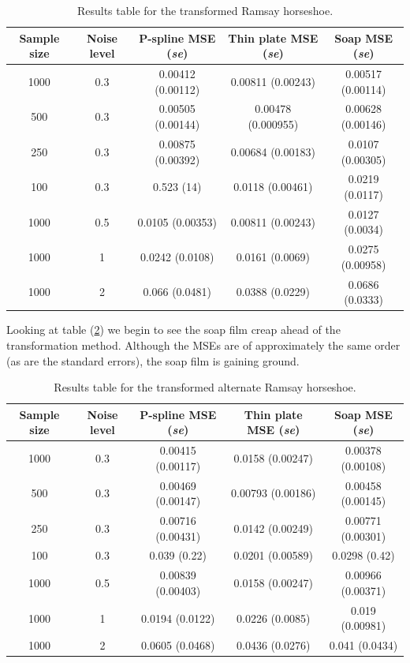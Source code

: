 \documentclass[a4paper,10pt]{amsart}
\begin{document}
\begin{table}[ht]
\begin{tabular}{c c c c c}\\
Sample size & Noise level & P-spline MSE (\emph{se}) & Thin plate MSE (\emph{se}) & Soap MSE (\emph{se}) \\
\hline
\hline
1000 & 0.3 & 0.00412 (0.00112) & 0.00811 (0.00243) & 0.00517 (0.00114) \\ 
500 & 0.3 & 0.00505 (0.00144) & 0.00478 (0.000955) & 0.00628 (0.00146) \\ 
250 & 0.3 & 0.00875 (0.00392) & 0.00684 (0.00183) & 0.0107 (0.00305) \\ 
100 & 0.3 & 0.523 (14) & 0.0118 (0.00461) & 0.0219 (0.0117) \\ 
1000 & 0.5 & 0.0105 (0.00353) & 0.00811 (0.00243) & 0.0127 (0.0034) \\ 
1000 & 1 & 0.0242 (0.0108) & 0.0161 (0.0069) & 0.0275 (0.00958) \\ 
1000 & 2 & 0.066 (0.0481) & 0.0388 (0.0229) & 0.0686 (0.0333) \\ 
\end{tabular}
\label{ramsayresultstable}
\caption{Results table for the transformed Ramsay horseshoe.}
\end{table}

Looking at table (\ref{altramsayresultstable}) we begin to see the soap film creap ahead of the transformation method. Although the MSEs are of approximately the same order (as are the standard errors), the soap film is gaining ground.

\begin{table}[ht]
\begin{tabular}{c c c c c}\\
Sample size & Noise level & P-spline MSE (\emph{se}) & Thin plate MSE (\emph{se}) & Soap MSE (\emph{se}) \\
\hline
\hline
1000 & 0.3 & 0.00415 (0.00117) & 0.0158 (0.00247) & 0.00378 (0.00108) \\ 
500 & 0.3 & 0.00469 (0.00147) & 0.00793 (0.00186) & 0.00458 (0.00145) \\ 
250 & 0.3 & 0.00716 (0.00431) & 0.0142 (0.00249) & 0.00771 (0.00301) \\ 
100 & 0.3 & 0.039 (0.22) & 0.0201 (0.00589) & 0.0298 (0.42) \\ 
1000 & 0.5 & 0.00839 (0.00403) & 0.0158 (0.00247) & 0.00966 (0.00371) \\ 
1000 & 1 & 0.0194 (0.0122) & 0.0226 (0.0085) & 0.019 (0.00981) \\ 
1000 & 2 & 0.0605 (0.0468) & 0.0436 (0.0276) & 0.041 (0.0434) \\ 
\end{tabular}
\label{altramsayresultstable}
\caption{Results table for the transformed alternate Ramsay horseshoe.}
\end{table}
\end{document}
